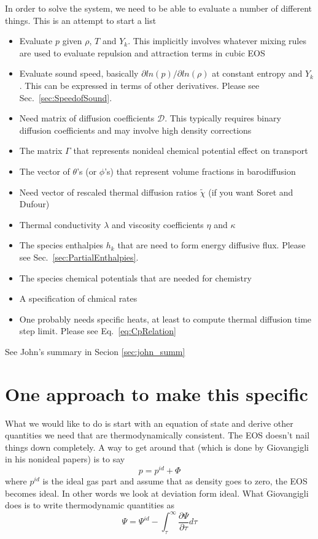 \documentclass[11pt]{article}
\begin{document}
In order to solve the system, we need to be able to evaluate a number of different things.
This is an attempt to start a list
\begin{itemize}
\item Evaluate $p$ given $\rho$, $T$ and $Y_k$. This implicitly involves whatever mixing rules are used to
evaluate repulsion and attraction terms in cubic EOS
\item Evaluate sound speed, basically $\partial ln(p)/ \partial ln(\rho)$ at constant entropy and $Y_k$. This
can be expressed in terms of other derivatives. Please see Sec.~\ref{sec:SpeedofSound}. 
\item Need matrix of diffusion coefficients $\mathcal{D}$.  This typically requires binary diffusion coefficients and may involve high density corrections
\item The matrix $\Gamma$ that represents nonideal chemical potential effect on transport
\item The vector of $\theta$'s (or $\phi$'s) that represent volume fractions in barodiffusion
\item Need vector of rescaled thermal diffusion ratios $\tilde{\chi}$ (if you want Soret and Dufour)
\item Thermal conductivity $\lambda$ and viscosity coefficients $\eta$ and $\kappa$
\item The species enthalpies $h_k$ that are need to form energy diffusive flux. Please see Sec.~\ref{sec:PartialEnthalpies}. 
\item The species chemical potentials that are needed for chemistry
\item A specification of chmical rates
\item One probably needs specific heats, at least to compute thermal diffusion time step limit. Please see Eq.~\ref{eq:CpRelation}
\end{itemize}

See John's summary in Secion \ref{sec:john_summ}

\section{One approach to make this specific}

What we would like to do is start with an equation of state and derive other quantities we need that
are thermodynamically consistent.  The EOS doesn't nail things down completely.  A way to get around that
(which is done by Giovangigli in his nonideal papers) is to
say
\[
p = p^{id} + \Phi
\]
where $p^{id}$ is the ideal gas part and assume that as density goes to zero, the EOS becomes
ideal.  In other words we look at deviation form ideal.
What Giovangigli does is to write thermodynamic quantities as
\[
\Psi = \Psi^{id} - \int_\tau^\infty \frac{\partial \Psi}{\partial \tau} d \tau
\]
\end{document}
